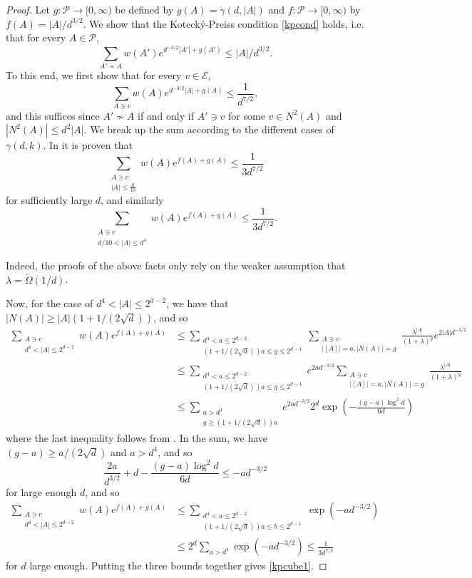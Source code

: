 \documentclass[10pt,a4paper]{amsart}
\theoremstyle{definition}
\newcommand{\cE}{\mathcal{E} }
\newcommand{\cP}{\mathcal{P} }
\newcommand{\beq}[1]{\begin{equation}\label{#1}}
\newcommand{\enq}[0]{\end{equation}}
\newcommand{\nin}[0]{\noindent}
\newcommand{\0}[0]{\emptyset}
\newcommand{\lam}{\lambda}
\begin{document}
\begin{proof}
    Let $g:\cP\rightarrow[0, \infty)$ be defined by $g(A)=\gamma(d, |A|)$ and $f:\cP\rightarrow[0, \infty)$ by $f(A)=|A|/d^{3/2}$. We show that the Koteck\'y-Preiss condition \eqref{kpcond} holds, i.e. that for every $A\in\cP$,
    \beq{kpcube1} \sum_{A'\not\sim A} w(A')e^{d^{-3/2}|A'| + g(A')}\leq |A|/d^{3/2}. \enq
    To this end, we first show that for every $v\in\cE$,
    \[ \sum_{A \ni v} w(A)e^{d^{-3/2}|A|+g(A)} \leq \frac{1}{d^{7/2}},\]
    and this suffices since $A'\not\sim A$ if and only if $A'\ni v$ for some $v\in N^2(A)$ and $|N^2(A)|\leq d^2|A|$. We break up the sum according to the different cases of $\gamma(d, k)$.
    In \cite[Lemma 15]{hypercube} it is proven that
    \[ \sum_{\substack{A\ni v \\ |A|\leq\frac{d}{10}}} w(A)e^{f(A)+g(A)}\leq \frac{1}{3d^{7/2}}\]
    for sufficiently large $d$, and similarly
    \[ \sum_{\substack{A\ni v \\ d/10< |A|\leq d^4}} w(A)e^{f(A)+g(A)} \leq \frac{1}{3d^{7/2}}.\]

\nin    Indeed, the proofs of the above facts only rely on the weaker assumption that $\lam=\tilde{\Omega}(1/d)$.

    Now, for the case of $d^4<|A|\leq 2^{d-2}$, we have that $|N(A)|\geq |A|(1+1/(2\sqrt{d}))$, and so
    \begin{align*} \sum_{\substack{A\ni v\\ d^4<|A|\leq 2^{d-2}}} w(A)e^{f(A)+g(A)} &\leq \sum_{\substack{ d^4<a\leq 2^{d-2} \\ (1+1/(2\sqrt{d}))a\leq g\leq 2^{d-1}}} \sum_{\substack{A\ni v \\ |[A]|=a, |N(A)|=g}} \frac{\lam^{|A|}}{(1+\lam)^g} e^{2|A|d^{-3/2}} \\ &\leq \sum_{\substack{ d^4<a\leq 2^{d-2} \\ (1+1/(2\sqrt{d}))a\leq g\leq 2^{d-1}}} e^{2ad^{-3/2}} \sum_{\substack{A\ni v \\ |[A]|=a, |N(A)|=g}} \frac{\lam^{|A|}}{(1+\lam)^g} \\ &\leq \sum_{\substack{a>d^4 \\ g\geq (1+1/(2\sqrt{d}))a}} e^{2ad^{-3/2}} 2^d \exp\left( -\frac{(g-a)\log^2 d}{6d}\right)
    \end{align*}
    where the last inequality follows from . In the sum, we have $(g-a)\geq a/(2\sqrt{d})$ and $a>d^4$, and so
    \[ \frac{2a}{d^{3/2}} + d - \frac{(g-a)\log^2d}{6d} \leq -ad^{-3/2}\]
    for large enough $d$, and so
    \begin{align*} \sum_{\substack{A\ni v \\ d^4<|A|\leq 2^{d-2}}} w(A)e^{f(A)+g(A)} &\leq \sum_{\substack{d^4<a\leq 2^{d-2} \\ (1+1/(2\sqrt{d}))a\leq b\leq 2^{d-1}}} \exp(-ad^{-3/2}) \\ &\leq 2^d \sum_{a>d^4} \exp(-ad^{-3/2}) \leq \frac{1}{3d^{7/2}}
    \end{align*}
    for $d$ large enough. Putting the three bounds together gives \eqref{kpcube1}.


\end{proof}
\end{document}
